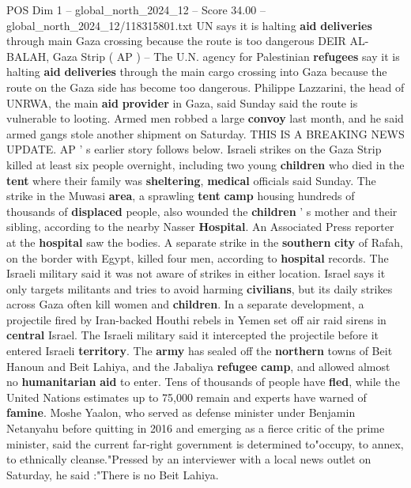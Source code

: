 \begin{textsample}{POS Dim 1 – global\_north\_2024\_12 – Score 34.00 – global\_north\_2024\_12/118315801.txt}  \label{ex:f1_pos_230}
UN says it is halting \textbf{aid} \textbf{deliveries} through main Gaza crossing because the route is too dangerous DEIR AL-BALAH, Gaza Strip ( AP ) -- The U.N. agency for Palestinian \textbf{refugees} say it is halting \textbf{aid} \textbf{deliveries} through the main cargo crossing into Gaza because the route on the Gaza side has become too dangerous.
Philippe Lazzarini, the head of UNRWA, the main \textbf{aid} \textbf{provider} in Gaza, said Sunday said the route is vulnerable to looting.
Armed men robbed a large \textbf{convoy} last month, and he said armed gangs stole another shipment on Saturday.
THIS IS A BREAKING NEWS UPDATE.
AP ' s earlier story follows below.
Israeli strikes on the Gaza Strip killed at least six people overnight, including two young \textbf{children} who died in the \textbf{tent} where their family was \textbf{sheltering}, \textbf{medical} officials said Sunday.
The strike in the Muwasi \textbf{area}, a sprawling \textbf{tent} \textbf{camp} housing hundreds of thousands of \textbf{displaced} people, also wounded the \textbf{children} ' s mother and their sibling, according to the nearby Nasser \textbf{Hospital}.
An Associated Press reporter at the \textbf{hospital} saw the bodies.
A separate strike in the \textbf{southern} \textbf{city} of Rafah, on the border with Egypt, killed four men, according to \textbf{hospital} records.
The Israeli military said it was not aware of strikes in either location.
Israel says it only targets militants and tries to avoid harming \textbf{civilians}, but its daily strikes across Gaza often kill women and \textbf{children}.
In a separate development, a projectile fired by Iran-backed Houthi rebels in Yemen set off air raid sirens in \textbf{central} Israel.
The Israeli military said it intercepted the projectile before it entered Israeli \textbf{territory}.
The \textbf{army} has sealed off the \textbf{northern} towns of Beit Hanoun and Beit Lahiya, and the Jabaliya \textbf{refugee} \textbf{camp}, and allowed almost no \textbf{humanitarian} \textbf{aid} to enter.
Tens of thousands of people have \textbf{fled}, while the United Nations estimates up to 75,000 remain and experts have warned of \textbf{famine}.
Moshe Yaalon, who served as defense minister under Benjamin Netanyahu before quitting in 2016 and emerging as a fierce critic of the prime minister, said the current far-right government is determined to"occupy, to annex, to ethnically cleanse."Pressed by an interviewer with a local news outlet on Saturday, he said :"There is no Beit Lahiya.

\end{textsample}
